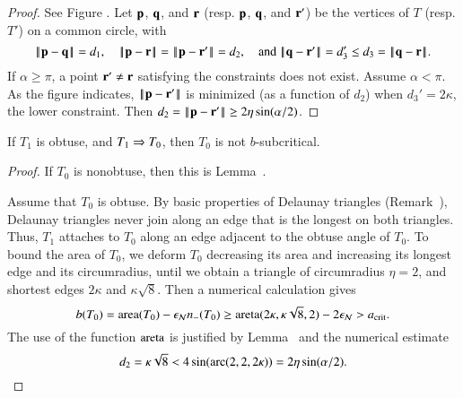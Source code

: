\begin{proof} 
  See Figure .  Let ${\mathbf p}$, ${\mathbf q}$, and ${\mathbf r}$ (resp. ${\mathbf p}$,
  ${\mathbf q}$, and ${\mathbf r}'$) be the vertices of $T$ (resp. $T'$) on a common
  circle, with
\[
\norm{\p}{\q} =d_1, 
\quad\norm{\p}{\r}=\norm{\p}{\r'}=d_2, \quad\text{and } 
\norm{\q}{\r'} = d_3' \le d_3=\norm{\q}{\r}.
\]
If $\alpha\ge\pi$, a point ${\mathbf r}'\ne {\mathbf r}$ satisfying the constraints does
not exist.  Assume $\alpha < \pi$.  As the figure indicates,
$\norm{\p}{\r'}$ is minimized (as a function of $d_2$) when $d_3' =
2\kappa$, the lower constraint.  Then $d_2 = \norm{\p}{\r'}\ge
2\eta\sin(\alpha/2)$.
\end{proof}



\begin{lemma}
  If $T_1$ is obtuse, and $T_1 \Rightarrow T_0$, then $T_0$ is not
  $b$-subcritical.
\end{lemma}


\begin{proof}  
  If $T_0$ is nonobtuse, then this is Lemma~.

Assume that $T_0$ is obtuse.  By basic properties of Delaunay
triangles (Remark~), Delaunay triangles never join
along an edge that is the longest on both triangles.  Thus, $T_1$
attaches to $T_0$ along an edge adjacent to the obtuse angle of $T_0$.
To bound the area of $T_0$, we deform $T_0$ decreasing its area and
increasing its longest edge and its circumradius, until we obtain a
triangle of circumradius $\eta=2$, and shortest edges $2\kappa$ and
$\kappa\sqrt{8}$.  Then a numerical calculation gives
\[
b(T_0) = {\operatorname{area}}(T_0) - \epsilon_{\mathcal N} n_-(T_0) \ge 
{\operatorname{areta}}(2\kappa,\kappa\sqrt{8},2) - 2\epsilon_{\mathcal N} > a_\text{crit}.
\] %
The use of the function ${\operatorname{areta}}$ is justified by
Lemma~ and the numerical estimate
\[
d_2 = \kappa\sqrt8 <  4 \sin(\operatorname{arc}(2,2,2\kappa)) = 2\eta\sin(\alpha/2).
\] %
\end{proof}


